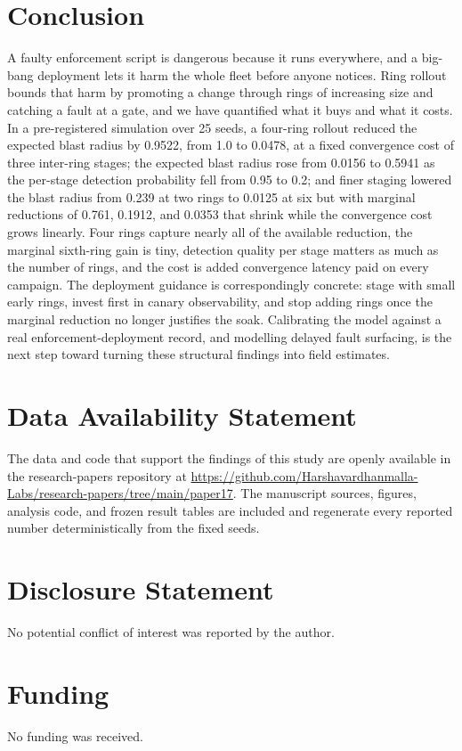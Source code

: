 \documentclass[journal]{IEEEtran}
\begin{document}
\section{Conclusion}
A faulty enforcement script is dangerous because it runs everywhere, and a big-bang deployment lets
it harm the whole fleet before anyone notices. Ring rollout bounds that harm by promoting a change
through rings of increasing size and catching a fault at a gate, and we have quantified what it buys
and what it costs. In a pre-registered simulation over 25 seeds, a four-ring rollout reduced the
expected blast radius by 0.9522, from 1.0 to 0.0478, at a fixed convergence cost of three inter-ring
stages; the expected blast radius rose from 0.0156 to 0.5941 as the per-stage detection probability
fell from 0.95 to 0.2; and finer staging lowered the blast radius from 0.239 at two rings to 0.0125
at six but with marginal reductions of 0.761, 0.1912, and 0.0353 that shrink while the convergence
cost grows linearly. Four rings capture nearly all of the available reduction, the marginal sixth-ring
gain is tiny, detection quality per stage matters as much as the number of rings, and the cost is
added convergence latency paid on every campaign. The deployment guidance is correspondingly
concrete: stage with small early rings, invest first in canary observability, and stop adding rings
once the marginal reduction no longer justifies the soak. Calibrating the model against a real
enforcement-deployment record, and modelling delayed fault surfacing, is the next step toward turning
these structural findings into field estimates.

\section*{Data Availability Statement}
The data and code that support the findings of this study are openly available in the research-papers repository at \url{https://github.com/Harshavardhanmalla-Labs/research-papers/tree/main/paper17}. The manuscript sources, figures, analysis code, and frozen result tables are included and regenerate every reported number deterministically from the fixed seeds.

\section*{Disclosure Statement}
No potential conflict of interest was reported by the author.

\section*{Funding}
No funding was received.
\end{document}
